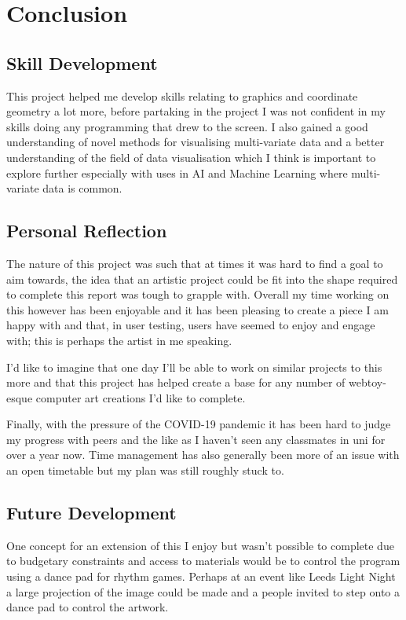 \chapter{Conclusion}
\section{Skill Development}
This project helped me develop skills relating to graphics and coordinate
geometry a lot more, before partaking in the project I was not confident in my
skills doing any programming that drew to the screen. I also gained a good
understanding of novel methods for visualising multi-variate data and a better
understanding of the field of data visualisation which I think is important to
explore further especially with uses in AI and Machine Learning where
multi-variate data is common.

\section{Personal Reflection}
The nature of this project was such that at times it was hard to find a goal to
aim towards, the idea that an artistic project could be fit into the shape
required to complete this report was tough to grapple with. Overall my time
working on this however has been enjoyable and it has been pleasing to create a
piece I am happy with and that, in user testing, users have seemed to enjoy and
engage with; this is perhaps the artist in me speaking. 

I'd like to imagine that one day I'll be able to work on similar projects to
this more and that this project has helped create a base for any number of
webtoy-esque computer art creations I'd like to complete.

Finally, with the pressure of the COVID-19 pandemic it has been hard to judge my
progress with peers and the like as I haven't seen any classmates in uni for
over a year now. Time management has also generally been more of an issue with
an open timetable but my plan was still roughly stuck to.

\section{Future Development}
One concept for an extension of this I enjoy but wasn't possible to complete due
to budgetary constraints and access to materials would be to control the program
using a dance pad for rhythm games. Perhaps at an event like Leeds Light Night a
large projection of the image could be made and a people invited to step onto a
dance pad to control the artwork.

